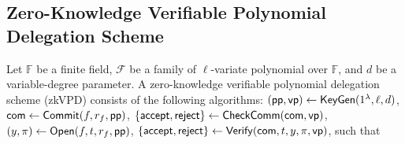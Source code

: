 
\subsection{Zero-Knowledge Verifiable Polynomial Delegation Scheme}
\label{subsec::zkvpd}

Let $\mathbb{F}$ be a finite field, $\mathcal{F}$ be a family of $\ell$-variate polynomial over $\mathbb{F}$, and $d$ be a variable-degree parameter. A zero-knowledge verifiable polynomial delegation scheme (zkVPD) consists of the following algorithms: $(\mathsf{pp}, \mathsf{vp}) \leftarrow \mathsf{KeyGen}(1^\lambda, \ell, d)$, ${{\sf com}} \leftarrow \mathsf{Commit}(f, r_f, \mathsf{pp})$, $\{\mathsf{accept},\mathsf{reject}\}\leftarrow\mathsf{CheckComm}({{\sf com}}, \mathsf{vp})$, $(y,\pi)\leftarrow\mathsf{Open}(f,t,r_f,\mathsf{pp})$, $\{\mathsf{accept},\mathsf{reject}\}\leftarrow\mathsf{Verify}({{\sf com}},t,y,\pi,\mathsf{vp})$, such that 


